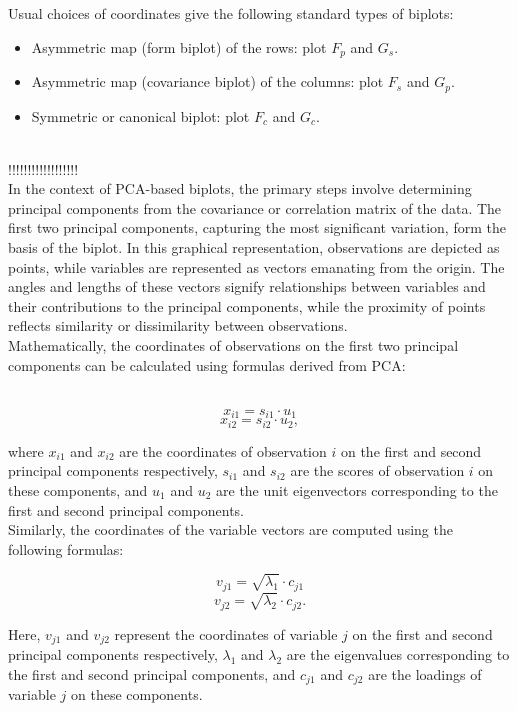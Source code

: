 \documentclass{article}\usepackage[]{graphicx}\usepackage[]{xcolor}
\numberwithin{equation}{section}
\begin{document}
{\noindent Usual choices of coordinates give the following standard types of biplots:
\begin{itemize}
  \item Asymmetric map (form biplot) of the rows: plot $F_p$ and $G_s$.
  \item Asymmetric map (covariance biplot) of the columns: plot $F_s$ and $G_p$.
  \item Symmetric or canonical biplot: plot $F_c$ and $G_c$.
\end{itemize} \\

!!!!!!!!!!!!!!!!!!\\

\noindent In the context of PCA-based biplots, the primary steps involve determining principal components from the covariance or correlation matrix of the data. The first two principal components, capturing the most significant variation, form the basis of the biplot. In this graphical representation, observations are depicted as points, while variables are represented as vectors emanating from the origin. The angles and lengths of these vectors signify relationships between variables and their contributions to the principal components, while the proximity of points reflects similarity or dissimilarity between observations.\\

\noindent Mathematically, the coordinates of observations on the first two principal components can be calculated using formulas derived from PCA:

$$\[
x_{i1} = s_{i1} \cdot u_{1}
\]
\[
x_{i2} = s_{i2} \cdot u_{2},
\]

\noindent where \( x_{i1} \) and \( x_{i2} \) are the coordinates of observation \( i \) on the first and second principal components respectively, \( s_{i1} \) and \( s_{i2} \) are the scores of observation \( i \) on these components, and \( u_{1} \) and \( u_{2} \) are the unit eigenvectors corresponding to the first and second principal components.\\

\noindent Similarly, the coordinates of the variable vectors are computed using the following formulas:

\[
v_{j1} = \sqrt{\lambda_{1}} \cdot c_{j1}
\]
\[
v_{j2} = \sqrt{\lambda_{2}} \cdot c_{j2}.
\]

\noindent Here, \( v_{j1} \) and \( v_{j2} \) represent the coordinates of variable \( j \) on the first and second principal components respectively, \( \lambda_{1} \) and \( \lambda_{2} \) are the eigenvalues corresponding to the first and second principal components, and \( c_{j1} \) and \( c_{j2} \) are the loadings of variable \( j \) on these components.\\

}
\end{document}
